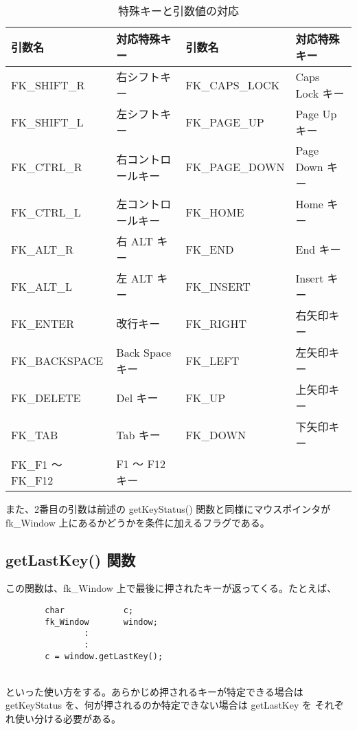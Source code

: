 \begin{table}[H]
\caption{特殊キーと引数値の対応}
\label{tbl:fkSpecialKey}
\begin{center}
\begin{tabular}{|p{3cm}|p{3cm}||p{3cm}|p{3cm}|}
\hline
引数名 & 対応特殊キー & 引数名 & 対応特殊キー \\ \hline \hline
FK\_SHIFT\_R	& 右シフトキー &
	FK\_CAPS\_LOCK	& Caps Lock キー \\ \hline
FK\_SHIFT\_L	& 左シフトキー &
	FK\_PAGE\_UP	& Page Up キー \\ \hline
FK\_CTRL\_R	& 右コントロールキー &
	FK\_PAGE\_DOWN	& Page Down キー \\ \hline
FK\_CTRL\_L	& 左コントロールキー &
	FK\_HOME	& Home キー \\ \hline
FK\_ALT\_R	& 右 ALT キー &
	FK\_END		& End キー \\ \hline
FK\_ALT\_L	& 左 ALT キー &
	FK\_INSERT	& Insert キー \\ \hline
FK\_ENTER	& 改行キー &
	FK\_RIGHT	& 右矢印キー \\ \hline
FK\_BACKSPACE	& Back Space キー &
	FK\_LEFT	& 左矢印キー \\ \hline
FK\_DELETE	& Del キー &
	FK\_UP		& 上矢印キー \\ \hline
FK\_TAB		& Tab キー &
	FK\_DOWN	& 下矢印キー \\ \hline
FK\_F1 〜 FK\_F12 & F1 〜 F12 キー &
		& \\ \hline
\end{tabular}
\end{center}
\end{table}

また、2番目の引数は前述の getKeyStatus() 関数と同様にマウスポインタが
fk\_Window 上にあるかどうかを条件に加えるフラグである。
\subsection*{getLastKey() 関数}
この関数は、fk\_Window 上で最後に押されたキーが返ってくる。たとえば、
\\
\begin{breakbox}
\begin{verbatim}
        char            c;
        fk_Window       window;
                :
                :
        c = window.getLastKey();
\end{verbatim}
\end{breakbox}
~ \\
といった使い方をする。あらかじめ押されるキーが特定できる場合は
getKeyStatus を、何が押されるのか特定できない場合は getLastKey を
それぞれ使い分ける必要がある。
